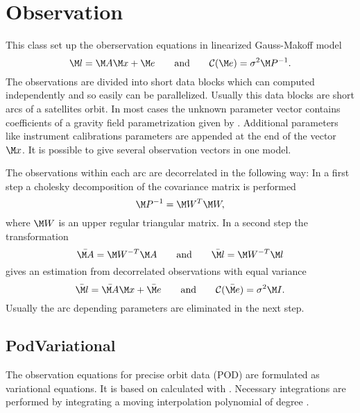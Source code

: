 \clearpage

\section{Observation}\label{observationType}
This class set up the oberservation equations in linearized Gauss-Makoff model
\begin{equation}\label{gmm}
\M l  = \M A \M x + \M e\qquad\text{and}\qquad\mathcal{C}(\M e) = \sigma^2\M P^{-1}.
\end{equation}
The observations are divided into short data blocks which can computed independently
and so easily can be parallelized. Usually this data blocks are short arcs of a
satellites orbit. In most cases the unknown parameter vector contains coefficients
of a gravity field parametrization given by .
Additional parameters like instrument calibrations parameters are appended at the
end of the vector~$\M x$.
It is possible to give several observation vectors in one model.

The observations within each arc are decorrelated in the following way:
In a first step a cholesky decomposition of the covariance matrix is performed
\begin{equation}
\M P^{-1} = \M W^T\M W,
\end{equation}
where $\M W$ is an upper regular triangular matrix.
In a second step the transformation
\begin{equation}\label{dekorrelierung}
\bar{\M A} = \M W^{-T}\M A\qquad\text{and}\qquad \bar{\M l} = \M W^{-T}\M l
\end{equation}
gives an estimation from decorrelated observations with equal variance
\begin{equation}\label{normal.GMM}
\bar{\M l} = \bar{\M A} \M x + \bar{\M e}
\qquad\text{and}\qquad
\mathcal{C}(\bar{\M e})= \sigma^2 \M I.
\end{equation}
Usually the arc depending parameters are eliminated in the next step.


\subsection{PodVariational}\label{observationType:podVariational}
The observation equations for precise orbit data (POD) are formulated as variational equations.
It is based on  calculated with .
Necessary integrations are performed by integrating a moving interpolation polynomial of degree .

